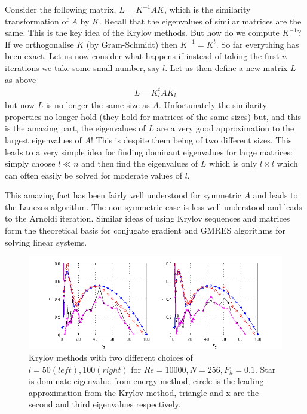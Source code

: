 Consider the following matrix, $L=K^{-1}AK$, which is the similarity transformation of $A$ by $K$. Recall that the eigenvalues of similar matrices are the same. This is the key idea of the Krylov methods. But how do we compute $K^{-1}$? If we orthogonalise $K$ (by Gram-Schmidt) then $K^{-1}=K^{t}$. So far everything has been exact. Let us now consider what happens if  instead of taking the first $n$ iterations we take some small number, say $l$. Let us then define a new matrix $L$ as above
\begin{align}
L=K_{l}^{t}AK_{l}
\end{align}
but now $L$ is no longer the same size as $A$. Unfortunately the similarity properties no longer hold (they hold for matrices of the same sizes) but, and this is the amazing part, the eigenvalues of $L$ are a very good approximation to the largest eigenvalues of $A$! This is despite them being of two different sizes. This leads to a very simple idea for finding dominant eigenvalues for large matrices: simply choose $l\ll n$ and then find the eigenvalues of $L$ which is only $l\times l$ which can often easily be solved for moderate values of $l$.

 This amazing fact has been fairly well understood for symmetric $A$ and leads to the Lanczos algorithm. The non-symmetric case is less well understood and leads to the Arnoldi iteration. Similar ideas of using Krylov sequences and matrices form the theoretical basis for conjugate gradient and GMRES algorithms for solving linear systems.

\begin{figure}
\begin{center}
\includegraphics[scale=0.7]{final_data.png}
\caption{Krylov methods with two different choices of $l=50 (left), 100 (right)$ for $Re=10000, N=256, F_{h}=0.1$. Star is dominate eigenvalue from energy method, circle is the leading approximation from the Krylov method, triangle and x are the second and third eigenvalues respectively.}
\end{center}
\end{figure}

